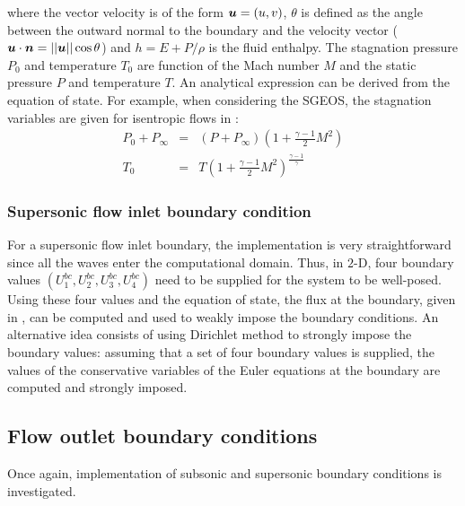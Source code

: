 %   
\noindent 
where the vector velocity is of the form $\boldsymbol u = \left( u,v \right)$, $\theta$ is defined as the angle between the outward normal to the boundary and the velocity vector ($\boldsymbol u \cdot \boldsymbol n = || \boldsymbol u || \cos \theta$) and $h = E + P / \rho$ is the fluid enthalpy. The stagnation pressure $P_0$ and temperature $T_0$ are function of the Mach number $M$ and the static pressure $P$ and temperature $T$. An analytical expression can be derived from the equation of state. For example, when considering the SGEOS, the stagnation variables are given for isentropic flows in  \cite{SEM}:
\begin{eqnarray}\label{eq:stag_bc_sct3}
P_0 + P_\infty &=& \left( P + P_\infty \right) \left( 1 + \frac{\gamma-1}{2}M^2 \right)\\
T_0 &=& T \left( 1 + \frac{\gamma-1}{2}M^2 \right)^{\frac{\gamma-1}{\gamma}}
\end{eqnarray}   
\subsubsection{Supersonic flow inlet boundary condition} \label{sec:sup-flow-inlet-bc}
For a supersonic flow inlet boundary, the implementation is very straightforward since all the waves enter the computational domain. Thus, in $2$-D, four boundary values $\left(U_1^{bc}, U_2^{bc}, U_3^{bc}, U_4^{bc}\right)$ need to be supplied for the system to be well-posed. Using these four values and the equation of state, the flux at the boundary, given in , can be computed and used to weakly impose the boundary conditions. An alternative idea consists of using Dirichlet method to strongly impose the boundary values: assuming that a set of four boundary values is supplied, the values of the conservative variables of the Euler equations at the boundary are computed and strongly imposed. 
\subsection{Flow outlet boundary conditions} \label{sec:flow-outlet-bc}
Once again, implementation of subsonic and supersonic boundary conditions is investigated.

